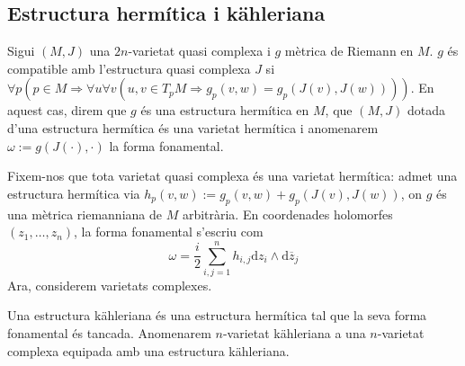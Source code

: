 \subsection{Estructura hermítica i kähleriana}
\begin{definicio}
    Sigui $(M,J)$ una $2n$-varietat quasi complexa i $g$ mètrica de Riemann en $M$. $g$ és compatible amb l'estructura quasi complexa $J$ si $\forall p(p\in M\Rightarrow\forall u\forall v(u,v\in T_{p}M\Rightarrow g_{p}(v,w)=g_{p}(J(v),J(w))))$. En aquest cas, direm que $g$ és una estructura hermítica en $M$, que $(M,J)$ dotada d'una estructura hermítica és una varietat hermítica i anomenarem $\omega:=g(J(\cdot),\cdot)$ la forma fonamental. 
\end{definicio}
Fixem-nos que tota varietat quasi complexa és una varietat hermítica: admet una estructura hermítica via $h_{p}(v,w):=g_{p}(v,w)+g_{p}(J(v),J(w))$, on $g$ és una mètrica riemanniana de $M$ arbitrària.\newline
En coordenades holomorfes $(z_{1},\ldots,z_{n})$, la forma fonamental s'escriu com
\begin{equation*}
    \omega
    =\frac{i}{2}\sum_{i,j=1}^{n}h_{i,j}\textrm{d}z_{i}\wedge\textrm{d}\overline{z}_{j}
\end{equation*}
Ara, considerem varietats complexes.
\begin{definicio}
    Una estructura kähleriana és una estructura hermítica tal que la seva forma fonamental és tancada. Anomenarem $n$-varietat kähleriana a una $n$-varietat complexa equipada amb una estructura kähleriana.
\end{definicio}
